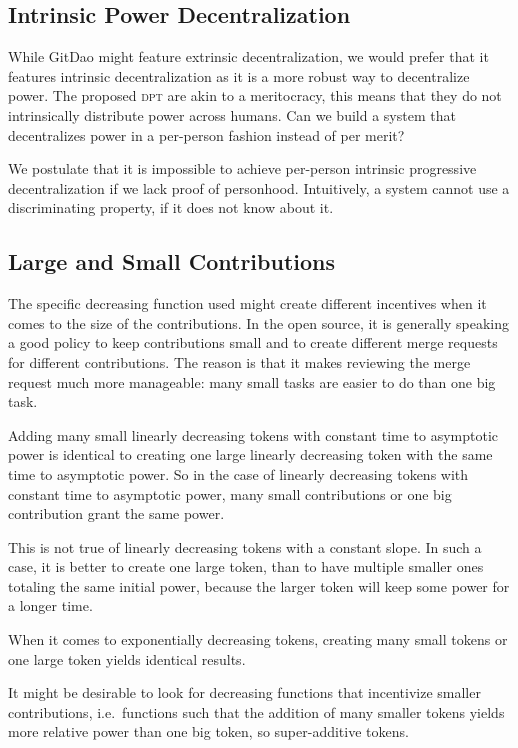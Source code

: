 \subsection{Intrinsic Power Decentralization}
\label{sec:governance_system_chamber_721_intrinsic_power_decentralization}

While GitDao might feature extrinsic decentralization, we would prefer that it features intrinsic decentralization as it is a more robust way to decentralize power.
The proposed \textsc{dpt} are akin to a meritocracy, this means that they do not intrinsically distribute power across humans.
Can we build a system that decentralizes power in a per-person fashion instead of per merit?

We postulate that it is impossible to achieve per-person intrinsic progressive decentralization if we lack proof of personhood.
Intuitively, a system cannot use a discriminating property, if it does not know about it.

\subsection{Large and Small Contributions}

The specific decreasing function used might create different incentives when it comes to the size of the contributions.
In the open source, it is generally speaking a good policy to keep contributions small and to create different merge requests for different contributions.
The reason is that it makes reviewing the merge request much more manageable: many small tasks are easier to do than one big task.

Adding many small linearly decreasing tokens with constant time to asymptotic power is identical to creating one large linearly decreasing token with the same time to asymptotic power.
So in the case of linearly decreasing tokens with constant time to asymptotic power, many small contributions or one big contribution grant the same power.

This is not true of linearly decreasing tokens with a constant slope.
In such a case, it is better to create one large token, than to have multiple smaller ones totaling the same initial power, because the larger token will keep some power for a longer time.

When it comes to exponentially decreasing tokens, creating many small tokens or one large token yields identical results.

It might be desirable to look for decreasing functions that incentivize smaller contributions, i.e.\ functions such that the addition of many smaller tokens yields more relative power than one big token, so super-additive tokens.

